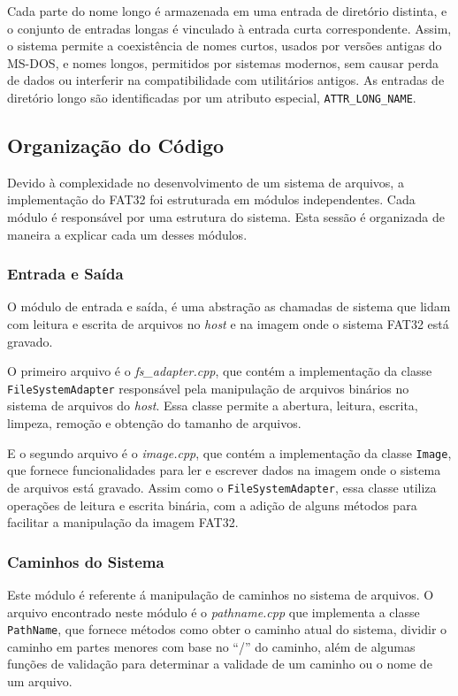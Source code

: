 \documentclass[
    12pt,				%
    oneside,   	        %
    a4paper,			%
    english,			%
    french,				%
    spanish,			%
    brazil,				%
    ]{pacotes/abntex2}
\begin{document}
Cada parte do nome longo é armazenada em uma entrada de diretório distinta, e o conjunto de entradas longas é vinculado à entrada curta correspondente. Assim, o sistema permite a coexistência de nomes curtos, usados por versões antigas do MS-DOS, e nomes longos, permitidos por sistemas modernos, sem causar perda de dados ou interferir na compatibilidade com utilitários antigos. As entradas de diretório longo são identificadas por um atributo especial, \texttt{ATTR\_LONG\_NAME}.

\subsection{Organização do Código}
\label{subsubsec:code}

Devido à complexidade no desenvolvimento de um sistema de arquivos, a implementação do FAT32 foi estruturada em módulos independentes. Cada módulo é responsável por uma estrutura do sistema. Esta sessão é organizada de maneira a explicar cada um desses módulos.

\subsubsection{Entrada e Saída}
\label{subsubsec:io}

O módulo de entrada e saída, é uma abstração as chamadas de sistema que lidam com leitura e escrita de arquivos no \textit{host} e na imagem onde o sistema FAT32 está gravado.

O primeiro arquivo é o \textit{fs\_adapter.cpp}, que contém a implementação da classe \texttt{FileSystemAdapter} responsável pela manipulação de arquivos binários no sistema de arquivos do \textit{host}. Essa classe permite a abertura, leitura, escrita, limpeza, remoção e obtenção do tamanho de arquivos.

E o segundo arquivo é o \textit{image.cpp}, que contém a implementação da classe \texttt{Image}, que fornece funcionalidades para ler e escrever dados na imagem onde o sistema de arquivos está gravado. Assim como o \texttt{FileSystemAdapter}, essa classe utiliza operações de leitura e escrita binária, com a adição de alguns métodos para facilitar a manipulação da imagem FAT32.

\subsubsection{Caminhos do Sistema}
\label{subsubsec:parser}

Este módulo é referente á manipulação de caminhos no sistema de arquivos. O arquivo encontrado neste módulo é o \textit{pathname.cpp} que implementa a classe \texttt{PathName}, que fornece métodos como obter o caminho atual do sistema, dividir o caminho em partes menores com base no ``/'' do caminho, além de algumas funções de validação para determinar a validade de um caminho ou o nome de um arquivo.  
\end{document}
